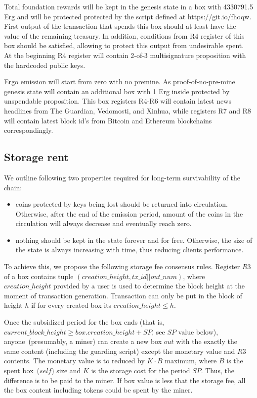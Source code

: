 Total foundation rewards will be kept in the genesis state in a box with 4330791.5 Erg and
will be protected protected by the script defined at https://git.io/fhoqw.
First output of the transaction that spends this box should at least have the value of the
remaining treasury.
In addition, conditions from R4 register of this box should be satisfied,
allowing to protect this output from undesirable spent.
At the beginning R4 register will contain 2-of-3
multisignature proposition with the hardcoded public keys.

Ergo emission will start from zero with no premine. As proof-of-no-pre-mine genesis state
will contain an additional box with 1 Erg inside protected by unspendable proposition.
This box registers R4-R6 will contain latest news headlines from The Guardian, Vedomosti, and Xinhua,
while registers R7 and R8 will contain latest block id's from Bitcoin and Ethereum blockchains correspondingly.

\subsection{Storage rent}

We outline following two properties required for long-term survivability of the chain:

\begin{itemize}
    \item{} coins protected by keys being lost should be returned into circulation.
    Otherwise, after the end of the emission period, amount of the coins
    in the circulation will always decrease and eventually reach zero.
    \item{} nothing should be kept in the state forever and for free.
    Otherwise, the size of the state is always increasing with time, thus reducing clients performance.
\end{itemize}

To achieve this, we propose the following storage fee consensus rules.
Register $R3$ of a box contains tuple $(creation\_height, tx\_id || out\_num)$, where $creation\_height$ provided by a user
is used to determine the block height at the moment of transaction generation.
Transaction can only be put in the block of height $h$ if for every created box its $creation\_height \le h$.

Once the subsidized period for the box ends (that is,
$current\_block\_height \ge box.creation\_height + SP$, see $SP$ value below), anyone~(presumably, a miner) can
create a new box $out$ with the exactly the same content (including the guarding
script) except the monetary value and $R3$ contents. The monetary value is to
reduced by $K \cdot B$ maximum, where $B$ is the spent box~($self$)
size and $K$ is the storage cost for the period $SP$. Thus, the difference is to be paid to the miner.
If box value is less that the storage fee, all the box content including tokens could be spent by the miner.

